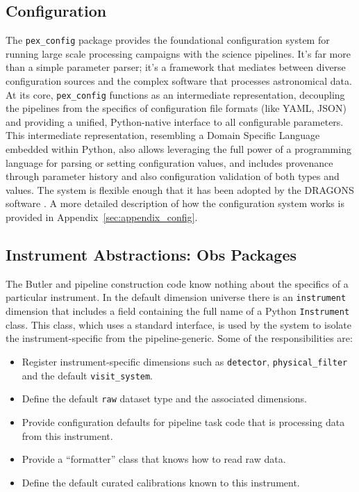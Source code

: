 \subsection{Configuration}
\label{sec:config}
The \texttt{pex\_config} package provides the foundational configuration system for running large scale processing campaigns with the science pipelines.
It's far more than a simple parameter parser; it's a framework that mediates between diverse configuration sources and the complex software that processes astronomical data.
At its core, \texttt{pex\_config} functions as an intermediate representation, decoupling the pipelines from the specifics of configuration file formats (like YAML, JSON) and providing a unified, Python-native interface to all configurable parameters.
This intermediate representation, resembling a Domain Specific Language embedded within Python, also allows leveraging the full power of a programming language for parsing or setting configuration values, and includes provenance through parameter history and also configuration validation of both types and values.
The system is flexible enough that it has been adopted by the DRAGONS software \citep{2023RNAAS...7..214L}.
A more detailed description of how the configuration system works is provided in Appendix~\ref{sec:appendix_config}.

\subsection{Instrument Abstractions: Obs Packages}
\label{sec:obs_packages}

The Butler and pipeline construction code know nothing about the specifics of a particular instrument.
In the default dimension universe there is an \texttt{instrument} dimension that includes a field containing the full name of a Python \texttt{Instrument} class.
This class, which uses a standard interface, is used by the system to isolate the instrument-specific from the pipeline-generic.
Some of the responsibilities are:

\begin{itemize}
\item Register instrument-specific dimensions such as \texttt{detector}, \texttt{physical\_filter} and the default \texttt{visit\_system}.
\item Define the default \texttt{raw} dataset type and the associated dimensions.
\item Provide configuration defaults for pipeline task code that is processing data from this instrument.
\item Provide a ``formatter'' class that knows how to read raw data.
\item Define the default curated calibrations known to this instrument.
\end{itemize}

